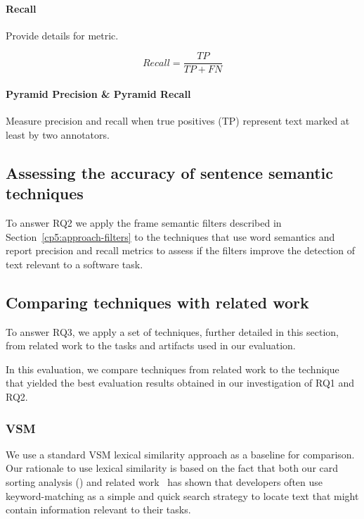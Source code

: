 \paragraph{\textbf{Recall}}

Provide details for metric.


\begin{equation}
\label{eq:cp5:recall}        
    Recall = \frac{TP}{TP + FN}
\end{equation}



\paragraph{\textbf{Pyramid Precision \& Pyramid Recall}} 

Measure precision and recall when true positives (TP) represent text marked at least by two annotators.


\subsection{Assessing the accuracy of sentence semantic techniques}


To answer RQ2 we apply the frame semantic filters described in Section~\ref{cp5:approach-filters} to the techniques that use word semantics and report precision and recall metrics to assess if the filters improve the detection of text relevant to a software task.




\subsection{Comparing techniques with related work}


To answer RQ3, we apply a set of techniques, further detailed in this section, from related work to the tasks and artifacts used in our evaluation. 


In this evaluation, we compare techniques from related work to the technique that yielded the best evaluation results obtained in our investigation of RQ1 and RQ2.


\subsubsection{VSM}



We use a standard VSM lexical similarity approach as a baseline for comparison. Our rationale to use 
lexical similarity is based on the fact that 
both our card sorting analysis () and related work~\cite{Ko2006a, Freund2015} has shown that developers often use keyword-matching as a simple and quick search strategy to locate text that might contain information relevant to their tasks.


